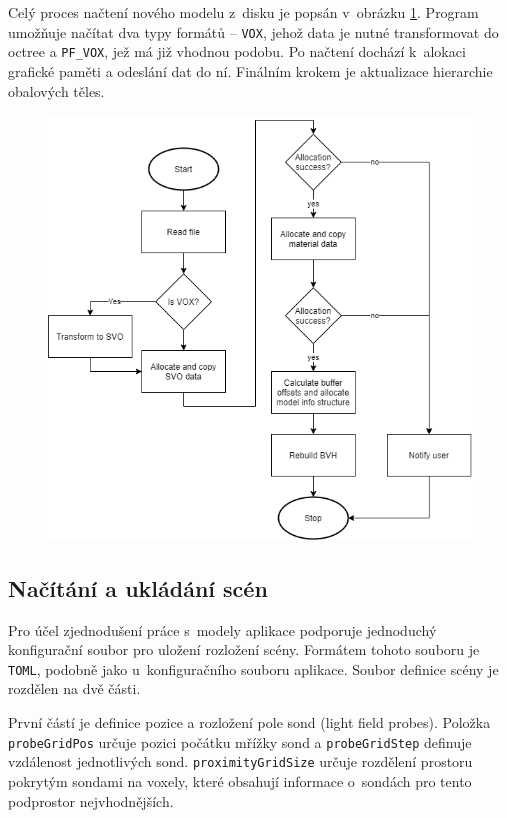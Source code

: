 Celý proces načtení nového modelu z~disku je popsán v~obrázku \ref{fig:load_model_diagram}. Program umožňuje načítat dva typy formátů -- \texttt{VOX}, jehož data je nutné transformovat do octree a \texttt{PF\_VOX}, jež má již vhodnou podobu. Po načtení dochází k~alokaci grafické paměti a odeslání dat do ní. Finálním krokem je aktualizace hierarchie obalových těles.

\begin{figure}[H]
	\centering
	\includegraphics[scale=0.7]{images/load_diagram.png}
	\captionsetup{justification=centering}
	\label{fig:load_model_diagram}
\end{figure}

\subsection{Načítání a ukládání scén}
Pro účel zjednodušení práce s~modely aplikace podporuje jednoduchý konfigurační soubor pro uložení rozložení scény. Formátem tohoto souboru je \texttt{TOML}, podobně jako u~konfiguračního souboru aplikace. Soubor definice scény je rozdělen na dvě části.

První částí je definice pozice a rozložení pole sond (light field probes). Položka \texttt{probeGridPos} určuje pozici počátku mřížky sond a \texttt{probeGridStep} definuje vzdálenost jednotlivých sond. \texttt{proximityGridSize} určuje rozdělení prostoru pokrytým sondami na voxely, které obsahují informace o~sondách pro tento podprostor nejvhodnějších.

